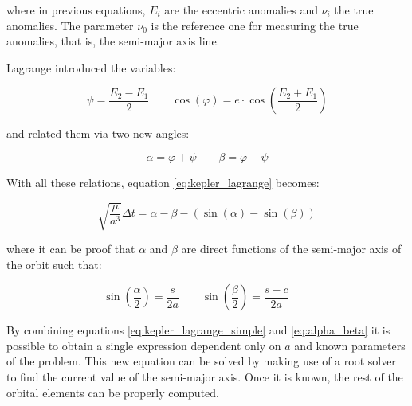 where in previous equations, $E_{i}$ are the eccentric anomalies and $\nu_{i}$
the true anomalies. The parameter $\nu_{0}$ is the reference one for measuring
the true anomalies, that is, the semi-major axis line.

Lagrange introduced the variables:

\begin{equation}
  \psi = \frac{E_2 - E_1}{2}\quad\quad
  \cos{(\varphi)} = e \cdot \cos{\left(\frac{E_2 + E_1}{2} \right)}
\end{equation}

and related them via two new angles:

\begin{equation}
  \alpha = \varphi + \psi\quad\quad
  \beta = \varphi - \psi
\end{equation}

With all these relations, equation \ref{eq:kepler_lagrange} becomes:

\begin{equation}
  \sqrt{\frac{\mu}{a^3}} \Delta t = \alpha - \beta - \left(\sin{(\alpha)} - \sin{(\beta)}\right)
  \label{eq:kepler_lagrange_simple}
\end{equation}

where it can be proof that $\alpha$ and $\beta$ are direct functions of the
semi-major axis of the orbit such that:

\begin{equation}
  \sin{\left(\frac{\alpha}{2} \right)} = \frac{s}{2a}\quad\quad
  \sin{\left(\frac{\beta}{2} \right)} = \frac{s - c}{2a}\quad\quad
  \label{eq:alpha_beta}
\end{equation}

By combining equations \ref{eq:kepler_lagrange_simple} and \ref{eq:alpha_beta}
it is possible to obtain a single expression dependent only on $a$ and known
parameters of the problem. This new equation can be solved by making use of a
root solver to find the current value of the semi-major axis. Once it is known,
the rest of the orbital elements can be properly computed.
